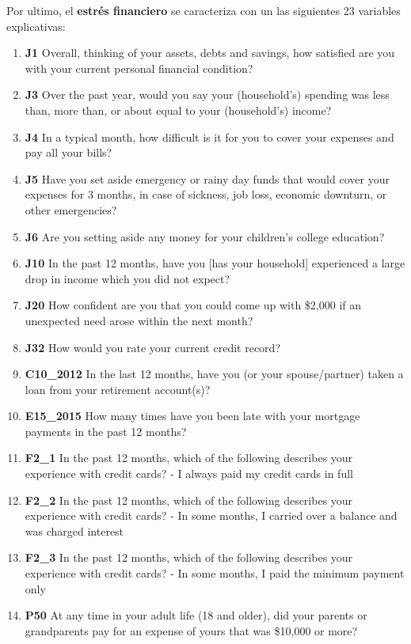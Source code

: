 \documentclass[a4paper, 11pt]{article}
\begin{document}
Por ultimo, el \textbf{estrés financiero} se caracteriza con un las siguientes 23 variables explicativas:
\begin{enumerate}
    \item \textbf{J1} Overall, thinking of your assets, debts and savings, how satisfied are you with your current
    personal financial condition? 
    \item \textbf{J3} Over the past year, would you say your (household's) spending was less than, more than, or about
    equal to your (household's) income?
    \item \textbf{J4} In a typical month, how difficult is it for you to cover your expenses and pay all your bills?
    \item \textbf{J5} Have you set aside emergency or rainy day funds that would cover your expenses for 3 months,
    in case of sickness, job loss, economic downturn, or other emergencies?
    \item \textbf{J6} Are you setting aside any money for your children's college education?
    \item \textbf{J10} In the past 12 months, have you [has your household] experienced a large  drop in income which
    you did not expect? 
    \item \textbf{J20} How confident are you that you could come up with \$2,000 if an unexpected need arose within
    the next month?
    \item \textbf{J32} How would you rate your current credit record?
    \item \textbf{C10\_2012} In the last 12 months, have you (or your spouse/partner) taken a loan from your retirement account(s)? 
    \item \textbf{E15\_2015} How many times have you been late with your mortgage payments in the past 12 months?
    \item \textbf{F2\_1}  In the past 12 months, which of the following describes your experience with credit cards? - I always paid my credit cards in full
    \item \textbf{F2\_2} In the past 12 months, which of the following describes your experience with credit cards? - In some months, I carried over a balance and was charged interest
    \item \textbf{F2\_3} In the past 12 months, which of the following describes your experience with credit cards? - In some months, I paid the minimum payment only
    \item \textbf{P50} At any time in your adult life (18 and older), did your parents or grandparents pay for an expense of yours that was \$10,000 or more?

\end{enumerate}
\end{document}
